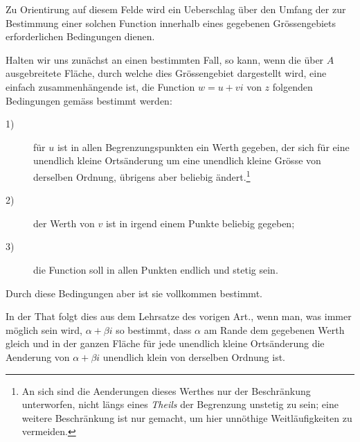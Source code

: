 \documentclass[a4paper,12pt]{article}
\begin{document}
Zu Orientirung auf diesem Felde wird ein Ueberschlag \"{u}ber den
Umfang der zur Bestimmung einer solchen Function innerhalb
eines gegebenen Gr\"{o}ssengebiets erforderlichen Bedingungen
dienen.

Halten wir uns zun\"{a}chst an einen bestimmten Fall, so kann,
wenn die \"{u}ber $A$ ausgebreitete Fl\"{a}che, durch welche dies
Gr\"{o}ssengebiet dargestellt wird, eine einfach
zusammenh\"{a}ngende ist, die Function $w = u + vi$ von $z$
folgenden Bedingungen gem\"{a}ss bestimmt werden:
\begin{description}

\item[\textmd{1)}]
f\"{u}r $u$ ist in allen Begrenzungspunkten ein Werth gegeben,
der sich f\"{u}r eine unendlich kleine Orts\"{a}nderung um eine
unendlich kleine Gr\"{o}sse von derselben Ordnung, \"{u}brigens
aber beliebig \"{a}ndert.\footnote{An sich sind die Aenderungen
dieses Werthes nur der Beschr\"{a}nkung unterworfen, nicht
l\"{a}ngs eines \emph{Theils} der Begrenzung unstetig zu sein;
eine weitere Beschr\"{a}nkung ist nur gemacht, um hier
unn\"{o}thige Weitl\"{a}ufigkeiten zu vermeiden.}

\item[\textmd{2)}]
der Werth von $v$ ist in irgend einem Punkte beliebig gegeben;

\item[\textmd{3)}]
die Function soll in allen Punkten endlich und stetig sein.
\end{description}

Durch diese Bedingungen aber ist sie vollkommen bestimmt.

In der That folgt dies aus dem Lehrsatze des vorigen Art., wenn
man, was immer m\"{o}glich sein wird, $\alpha + \beta i$ so
bestimmt, dass $\alpha$ am Rande dem gegebenen Werth gleich und
in der ganzen Fl\"{a}che f\"{u}r jede unendlich kleine
Orts\"{a}nderung die Aenderung von $\alpha + \beta i$ unendlich
klein von derselben Ordnung ist.
\end{document}
